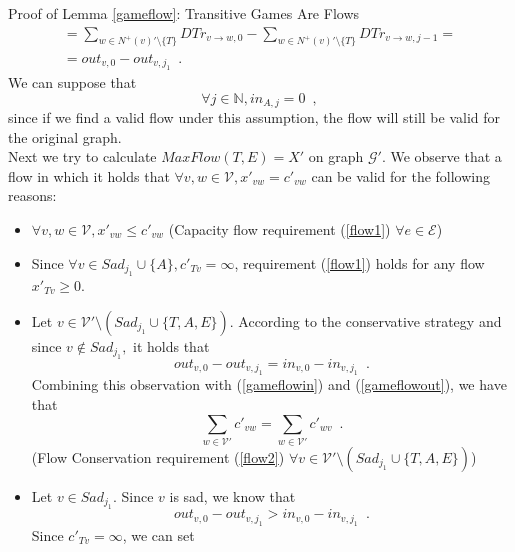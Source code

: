 \begin{sepproof}{Proof of Lemma \ref{gameflow}: Transitive Games Are Flows}
\begin{equation}
\begin{gathered}
      = \sum\limits_{w \in N^{+}\left(v\right)' \setminus \{T\}}DTr_{v \rightarrow w, 0} -
      \sum\limits_{w \in N^{+}\left(v\right)' \setminus \{T\}}DTr_{v \rightarrow w, j-1} = \\
      = out_{v, 0} - out_{v, j_1} \enspace.
   \end{gathered}
   \end{equation}
   We can suppose that
   \begin{equation}
   \label{Aincoming}
      \forall j \in \mathbb{N}, in_{A, j} = 0 \enspace,
   \end{equation}
   since if we find a valid flow under this assumption, the flow will still be valid for the original graph. \\
   Next we try to calculate $MaxFlow\left(T, E\right) = X'$ on graph $\mathcal{G}'$. We observe that a flow in which it
   holds that $\forall v, w \in \mathcal{V}, x'_{vw} = c'_{vw}$ can be valid for the following reasons:
   \begin{itemize}
      \item $\forall v,w \in \mathcal{V}, x'_{vw} \leq c'_{vw}$ (Capacity flow requirement (\ref{flow1}) $\forall e \in
      \mathcal{E}$)
      \item Since $\forall v \in Sad_{j_1} \cup \{A\}, c'_{Tv} = \infty$, requirement (\ref{flow1}) holds for any flow
      $x'_{Tv} \geq 0$.
      \item Let $v \in \mathcal{V}' \setminus \left(Sad_{j_1} \cup \{T, A, E\}\right)$. According to the conservative
      strategy and since $v \notin Sad_{j_1},$ it holds that
      \begin{equation*}
         out_{v, 0} - out_{v, j_1} = in_{v, 0} - in_{v, j_1} \enspace.
      \end{equation*}
      Combining this observation with (\ref{gameflowin}) and (\ref{gameflowout}), we have that
      \begin{equation*}
         \sum\limits_{w \in \mathcal{V}'}c'_{vw} = \sum\limits_{w \in \mathcal{V}'}c'_{wv} \enspace.
      \end{equation*}
      (Flow Conservation requirement (\ref{flow2}) $\forall v \in \mathcal{V}' \setminus \left(Sad_{j_1}
      \cup \{T, A, E\}\right)$)
      \item Let $v \in Sad_{j_1}$. Since $v$ is sad, we know that
      \begin{equation*}
         out_{v, 0} - out_{v, j_1} > in_{v, 0} - in_{v, j_1} \enspace.
      \end{equation*}
      Since $c'_{Tv} = \infty$, we can set

\end{itemize}
\end{sepproof}
